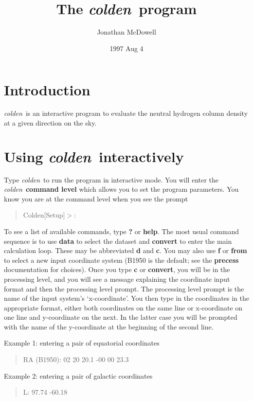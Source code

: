 \documentclass[12pt]{article}
\newcommand{\pr}{{\it colden}~}
\newcommand{\prompt}{Colden[Setup]$>$:~}
\begin{document}
\title {The \pr program}

\author{Jonathan McDowell}

\date{1997 Aug 4}


\maketitle




\section{Introduction}

\pr is an interactive program to evaluate the neutral hydrogen
column density at a given direction on the sky.

\section{ Using \pr interactively}

Type \pr to run the program in interactive mode.
You will enter the \pr {\bf command level} which allows you to set the
program parameters. You know you are at the command level when you see the
prompt
\begin{quote}
\prompt
\end{quote}

To see a list of available commands, type {\bf ?} or {\bf help}. The most
usual command sequence is to use {\bf data } to select the
dataset and {\bf convert } to enter the main calculation loop. These
 may be abbreviated
{\bf d} and {\bf c}.  You may also use {\bf f} or {\bf from} to
select a new input coordinate system (B1950 is the default; see the
{\bf precess} documentation for choices).
Once you type {\bf c} or {\bf convert}, you will be 
in the processing level, and you will see a message explaining the coordinate
input format and then the processing level prompt. The processing level
prompt is the name of the input system's `x-coordinate'. You then 
type in the coordinates in the appropriate format, either both coordinates
on the same line or x-coordinate on one line and y-coordinate on the next.
In the latter case you will be prompted with the name of the y-coordinate
at the beginning of the second line.


Example 1: entering a pair of equatorial coordinates\begin{quote}
RA (B1950): 02 20 20.1 -00 00 23.3
\end{quote}
Example 2: entering a pair of galactic coordinates\begin{quote}
L: 97.74 -60.18
\end{quote}
\end{document}
